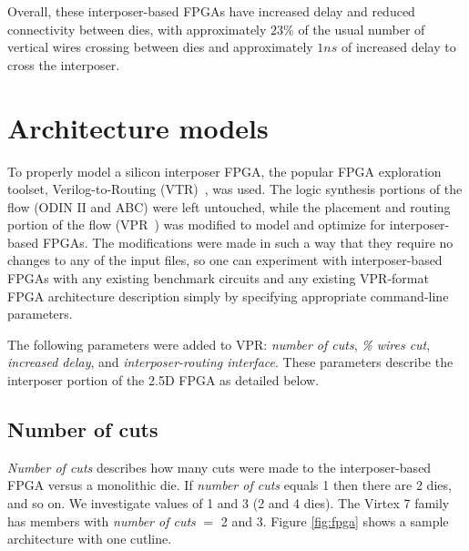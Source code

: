 \documentclass{sig-alternate-2013}
\begin{document}
Overall, these interposer-based FPGAs have increased delay and reduced connectivity between dies, with approximately $23\%$ of the usual number of vertical wires crossing between dies and approximately $1ns$ of increased delay to cross the interposer.

\section{Architecture models}
\label{archSection}
To properly model a silicon interposer FPGA, the popular FPGA exploration toolset, Verilog-to-Routing (VTR)~\cite{vtr2012}, was used. The logic synthesis portions of the flow (ODIN II and  ABC) were left untouched, while the placement and routing portion of the flow (VPR~\cite{betz1997vpr}) was modified to model and optimize for interposer-based FPGAs. The modifications were made in such a way that they require no changes to any of the input files, so one can experiment with interposer-based FPGAs with any existing benchmark circuits and any existing VPR-format FPGA architecture description simply by specifying appropriate command-line parameters.

The following parameters were added to VPR: \textit{number of cuts}, \textit{\% wires cut}, \textit{increased delay}, and \textit{interposer-routing interface}. These parameters describe the interposer portion of the 2.5D FPGA as detailed below.

\subsection{Number of cuts}
\textit{Number of cuts} describes how many cuts were made to the interposer-based FPGA versus a monolithic die. If \textit{number of cuts} equals 1 then there are 2 dies, and so on. We investigate values of 1 and 3 (2 and 4 dies). The Virtex 7 family has members with \textit{number of cuts} $=$ 2 and 3. Figure \ref{fig:fpga} shows a sample architecture with one cutline.
\end{document}
